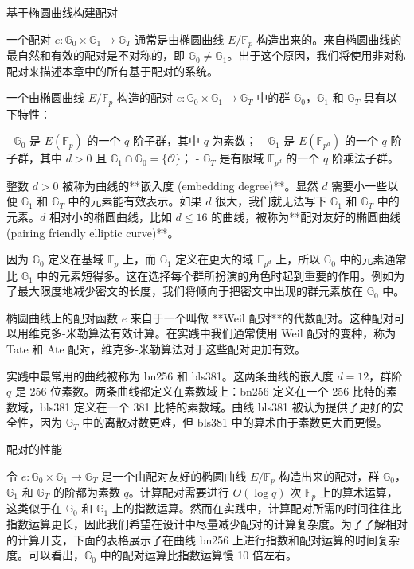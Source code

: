 基于椭圆曲线构建配对

一个配对 $e:\mathbb{G}_0 \times \mathbb{G}_1 \to \mathbb{G}_T$ 通常是由椭圆曲线 $E/\mathbb{F}_p$ 构造出来的。来自椭圆曲线的最自然和有效的配对是不对称的，即 $\mathbb{G}_0\neq\mathbb{G}_1$。出于这个原因，我们将使用非对称配对来描述本章中的所有基于配对的系统。

一个由椭圆曲线 $E/\mathbb{F}_p$ 构造的配对 $e:\mathbb{G}_0 \times \mathbb{G}_1 \to \mathbb{G}_T$ 中的群 $\mathbb{G}_0$，$\mathbb{G}_1$ 和 $\mathbb{G}_T$ 具有以下特性：

- $\mathbb{G}_0$ 是 $E(\mathbb{F}_{p})$ 的一个 $q$ 阶子群，其中 $q$ 为素数；
- $\mathbb{G}_1$ 是 $E(\mathbb{F}_{p^d})$ 的一个 $q$ 阶子群，其中 $d>0$ 且 $\mathbb{G}_1\cap\mathbb{G}_0=\{\mathcal{O}\}$；
- $\mathbb{G}_T$ 是有限域 $\mathbb{F}_{p^d}$ 的一个 $q$ 阶乘法子群。

整数 $d>0$ 被称为曲线的**嵌入度 (embedding degree)**。显然 $d$ 需要小一些以便 $\mathbb{G}_1$ 和 $\mathbb{G}_T$ 中的元素能有效表示。如果 $d$ 很大，我们就无法写下 $\mathbb{G}_1$ 和 $\mathbb{G}_T$ 中的元素。$d$ 相对小的椭圆曲线，比如 $d≤16$ 的曲线，被称为**配对友好的椭圆曲线 (pairing friendly elliptic curve)**。

因为 $\mathbb{G}_0$ 定义在基域 $\mathbb{F}_p$ 上，而 $\mathbb{G}_1$ 定义在更大的域 $\mathbb{F}_{p^d}$ 上，所以 $\mathbb{G}_0$ 中的元素通常比 $\mathbb{G}_1$ 中的元素短得多。这在选择每个群所扮演的角色时起到重要的作用。例如为了最大限度地减少密文的长度，我们将倾向于把密文中出现的群元素放在 $\mathbb{G}_0$ 中。

椭圆曲线上的配对函数 $e$ 来自于一个叫做 **Weil 配对**的代数配对。这种配对可以用维克多-米勒算法有效计算。在实践中我们通常使用 Weil 配对的变种，称为 Tate 和 Ate 配对，维克多-米勒算法对于这些配对更加有效。

实践中最常用的曲线被称为 bn256 和 bls381。这两条曲线的嵌入度 $d=12$，群阶 $q$ 是 256 位素数。两条曲线都定义在素数域上：bn256 定义在一个 256 比特的素数域，bls381 定义在一个 381 比特的素数域。曲线 bls381 被认为提供了更好的安全性，因为 $\mathbb{G}_T$ 中的离散对数更难，但 bls381 中的算术由于素数更大而更慢。

配对的性能

令 $e:\mathbb{G}_0 \times \mathbb{G}_1 \to \mathbb{G}_T$ 是一个由配对友好的椭圆曲线 $E/\mathbb{F}_p$ 构造出来的配对，群 $\mathbb{G}_0$，$\mathbb{G}_1$ 和 $\mathbb{G}_T$ 的阶都为素数 $q$。计算配对需要进行 $O(\log q)$ 次 $\mathbb{F}_p$ 上的算术运算，这类似于在 $\mathbb{G}_0$ 和 $\mathbb{G}_1$ 上的指数运算。然而在实践中，计算配对所需的时间往往比指数运算更长，因此我们希望在设计中尽量减少配对的计算复杂度。为了了解相对的计算开支，下面的表格展示了在曲线 bn256 上进行指数和配对运算的时间复杂度。可以看出，$\mathbb{G}_0$ 中的配对运算比指数运算慢 10 倍左右。


